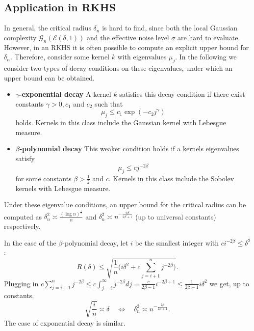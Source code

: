 \subsection{Application in RKHS}
In general, the critical radius $\delta_n$ is hard to find, since both the local Gaussian complexity $\mathcal{G}_n(\mathcal{E}(\delta,1))$ and the effective noise level $\sigma$ are hard to evaluate. However, in an RKHS it is often possible to compute an explicit upper bound for $\delta_n$. Therefore, consider some kernel $k$ with eigenvalues $\mu_j$. In the following we consider two types of decay-conditions on these eigenvalues, under which an upper bound can be obtained.
\begin{itemize}
\item \textbf{$\gamma$-exponential decay} A kernel $k$ satisfies this decay condition if there exist constants $\gamma >0, c_1$ and $c_2$ such that
\begin{equation*}
\mu_j \le c_1 \exp(-c_2 j^{\gamma})
\end{equation*}
holds. Kernels in this class include the Gaussian kernel with Lebesgue measure.
\item \textbf{$\beta$-polynomial decay} This weaker condition holds if a kernels eigenvalues satisfy
\begin{equation*}
\mu_j \le c j^{-2\beta}
\end{equation*}
for some constants $\beta>\frac{1}{2}$ and $c$. Kernels in this class include the Sobolev kernels with Lebesgue measure.
\end{itemize}
Under these eigenvalue conditions, an upper bound for the critical radius can be computed as $\delta_n^2\asymp \frac{(\log n)^{\frac{1}{\gamma}}}{n}$ and $\delta_n^2 \asymp n^{-\frac{2\beta}{2\beta + 1}}$ (up to universal constants) respectively.

In the case of the $\beta$-polynomial decay, let $i$ be the smallest integer with $ci^{-2\beta}\le \delta^2$:
\begin{equation*}
R(\delta) \le \sqrt{\frac{1}{n}\Big(i\delta^2 + c\sum_{j=i+1}^n j^{-2\beta}\Big)}.
\end{equation*}
Plugging in $c\sum_{j=i+1}^n j^{-2\beta}\le c\int_{j=i}^{\infty} j^{-2\beta}dj = \frac{c}{2\beta-1}i^{-2\beta + 1} \le \frac{1}{2\beta-1}i\delta^2$ we get, up to constants,
\begin{equation*}
\sqrt{\frac{i}{n}}\asymp \delta \quad \Leftrightarrow \quad\delta_n^2\asymp n^{-\frac{2\beta}{2\beta+1}}.
\end{equation*}
The case of exponential decay is similar.

